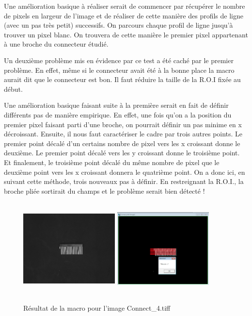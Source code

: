 \documentclass{scrreprt}
\begin{document}
Une amélioration basique à réaliser serait de commencer par récupérer le nombre de pixels en largeur de l'image et de réaliser de cette
manière des profils de ligne (avec un pas très petit) successifs. On parcours chaque profil de ligne jusqu'à trouver un pixel blanc. 
On trouvera de cette manière le premier pixel appartenant à une broche du connecteur étudié. 

Un deuxième problème mis en évidence par ce test a été caché par le premier problème. En effet, même si le connecteur avait été à la bonne place
la macro aurait dit que le connecteur est bon. Il faut réduire la taille de la R.O.I fixée au début.

Une amélioration basique faisant suite à la première serait en fait de définir différents pas de manière empirique. En effet, une fois qu'on a la 
position du premier pixel faisant parti d'une broche, on pourrait définir un pas minime en x décroissant. Ensuite, il nous faut caractériser le cadre
par trois autres points. Le premier point décalé d'un certains nombre de pixel vers les x croissant donne le deuxième. Le premier point décalé vers 
les y croissant donne le troisième point. Et finalement, le troisième point décalé du même nombre de pixel que le deuxième point vers les x croissant donnera
le quatrième point. On a donc ici, en suivant cette méthode, trois nouveaux pas à définir. En restreignant la R.O.I., la broche pliée sortirait du champs et
le problème serait bien détecté !

\begin{figure}[!h]
\centering
\includegraphics[width=5cm, height=5cm]{images/Connect4o.png}\hfill
\includegraphics[width=5cm, height=5cm]{images/connecteur4.png}
\caption{Résultat de la macro pour l'image Connect_4.tiff}
\end{figure} 
\end{document}
